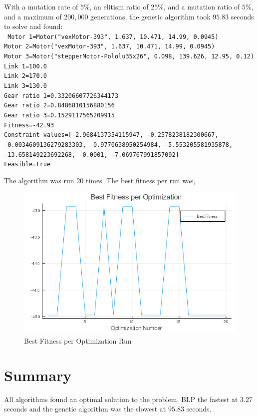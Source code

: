 \documentclass{article}
\begin{document}
With a mutation rate of $5\%$, an elitism ratio of $25\%$, and a mutation
ratio of $5\%$, and a maximum of $200,000$ generations, the genetic
algorithm took $95.83$ seconds to solve and found: \\
\texttt{
    Motor 1=Motor("vexMotor-393", 1.637, 10.471, 14.99, 0.0945) \\
    Motor 2=Motor("vexMotor-393", 1.637, 10.471, 14.99, 0.0945) \\
    Motor 3=Motor("stepperMotor-Pololu35x26", 0.098, 139.626, 12.95, 0.12) \\
    Link 1=100.0 \\
    Link 2=170.0 \\
    Link 3=130.0 \\
    Gear ratio 1=0.33206607726344173 \\
    Gear ratio 2=0.8486810156880156 \\
    Gear ratio 3=0.1529117565209915 \\
    Fitness=-42.93 \\
    Constraint values=[-2.9684137354115947, -0.2578238182300667, -0.0034609136279283303, -0.9770638950254984, -5.553205581935878, -13.658149223692268, -0.0001, -7.069767991857092] \\
    Feasible=true
}

The algorithm was run $20$ times. The best fitness per run was,
\begin{figure}[h]
    \centering
    \includegraphics[scale=0.5]{best_fitness_per_optimization.png}
    \caption{Best Fitness per Optimization Run}
    \label{fig:best_fitness_per_run}
\end{figure}

\FloatBarrier{}
\section{Summary}

All algorithms found an optimal solution to the problem. BLP the fastest at
$3.27$ seconds and the genetic algorithm was the slowest at $95.83$ seconds.

\FloatBarrier{}


\end{document}
